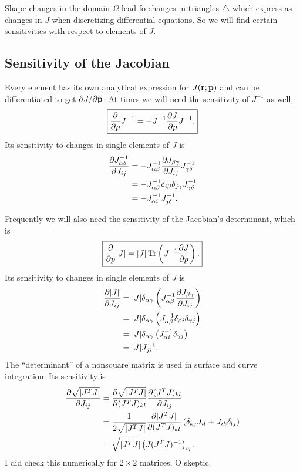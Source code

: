 Shape changes in the domain $\Omega$ lead fo changes in triangles $\bigtriangleup$ which express as changes in $J$ when discretizing differential equations.  So we will find certain sensitivities with respect to elements of $J$.

\subsection{Sensitivity of the Jacobian}

Every element has its own analytical expression for $J(\textbf{r}; \textbf{p})$ and can be differentiated to get $\partial{J}/\partial{\textbf{p}}$.  At times we will need the sensitivity of $J^{-1}$ as well,
%
\begin{equation}
\boxed{
\frac{\partial{}}{\partial{p}} J^{-1} = - J^{-1} \frac{\partial{J}}{\partial{p}} J^{-1}.
}
\end{equation}
%
Its sensitivity to changes in single elements of $J$ is
%
\begin{equation}
\label{eqn:jacobian_jacobian_sensitivity}
\begin{aligned}
\frac{\partial{J^{-1}_{\alpha \delta}}}{\partial{J_{ij}}} &= -J^{-1}_{\alpha \beta} \frac{\partial{J_{\beta \gamma}}}{\partial{J_{ij}}} J^{-1}_{\gamma \delta} \\
&= -J^{-1}_{\alpha \beta} \delta_{i \beta} \delta_{j \gamma} J^{-1}_{\gamma \delta} \\
&= -J^{-1}_{\alpha i} J^{-1}_{j \delta}.
\end{aligned}
\end{equation}

%
Frequently we will also need the sensitivity of the Jacobian's determinant, which is
%
\begin{equation}
\boxed{
\frac{\partial{}}{\partial{p}} |J| = |J| \operatorname{Tr} \left( J^{-1} \frac{\partial{J}}{\partial{p}} \right).
}
\end{equation}
%
Its sensitivity to changes in single elements of $J$ is
%
\begin{equation}
\begin{aligned}
\frac{\partial{|J|}}{\partial{J_{i j}}} &= |J| \delta_{\alpha \gamma} \left(  J^{-1}_{\alpha \beta} \frac{\partial{J_{\beta \gamma}}}{\partial{J_{i j}}} \right) \\
&= |J| \delta_{\alpha \gamma} \left( J^{-1}_{\alpha \beta} \delta_{\beta i} \delta_{\gamma j} \right) \\
&= |J| \delta_{\alpha \gamma} \left( J^{-1}_{\alpha i} \delta_{\gamma j} \right) \\
&= |J| J^{-1}_{ji}.
\end{aligned}
\end{equation}
%
The ``determinant'' of a nonsquare matrix is used in surface and curve integration.  Its sensitivity is
%
\begin{equation}
\begin{aligned}
\frac{\partial{\sqrt{| J^T J |}}}{\partial{J_{ij}}} &= \frac{\partial{\sqrt{|J^T J|}}}{\partial{(J^TJ)_{kl}}} \frac{\partial{(J^TJ)_{kl}}}{\partial{J_{ij}}} \\
&= \frac{1}{2\sqrt{|J^TJ|}} \frac{\partial{|J^T J|}}{\partial{(J^TJ)_{kl}}} \left( \delta_{k j} J_{i l} + J_{i k} \delta_{l j} \right) \\
&= \sqrt{|J^TJ|} \left( J (J^T J)^{-1} \right)_{ij}.
\end{aligned}
\end{equation}
%
I did check this numerically for $2 \times 2$ matrices, O skeptic.


